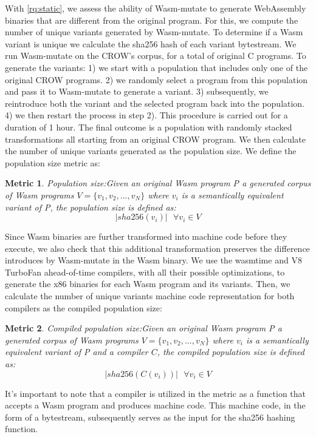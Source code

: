 \documentclass[sigplan,screen]{acmart}
\newcommand{\tool}{Wasm-mutate\xspace}
\newcommand{\wasm}{Wasm\xspace}
\newcommand{\Wasm}{WebAssembly\xspace}
\newtheorem{metric}{Metric}
\begin{document}
With \ref{rq:static},
we assess the ability of \tool to generate \Wasm binaries that are different from the original program.
For this, we compute the number of unique variants generated by \tool.
To determine if a \wasm variant is unique we calculate the sha256 hash of each variant bytestream.
We run \tool on the CROW's corpus, for a total of \nProgramsRosetta{} original C programs. 
To generate the variants:
1) we start with a population that includes only one of the original CROW programs. 
2) we randomly select a program from this population and pass it to \tool to generate a variant. 
3) subsequently, we reintroduce both the variant and the selected program back into the population. 
4) we then restart the process in step 2). 
This procedure is carried out for a duration of 1 hour.
The final outcome is a population with randomly stacked transformations all starting from an original CROW program.
We then calculate the number of unique variants generated as the population size.
We define the population size metric as:

\begin{metric}{Population size:}\label{metric:pop}
Given an original \wasm program P a generated corpus of \wasm programs $V=\{v_1, v_2, ..., v_N\}$ where $v_i$ is a semantically equivalent variant of P, the population size is defined as:
$$
    | sha256(v_i)|\text{ }\forall v_i \in V 
$$
\end{metric}


Since \wasm binaries are further transformed into machine code before they execute, we also check that this additional transformation preserves the difference introduces by \tool in the \wasm binary. 
We use the wasmtime and V8 TurboFan ahead-of-time compilers, with all their possible optimizations, to generate the x86 binaries for each \wasm program and its variants. 
Then, we calculate the number of unique variants machine code representation for both compilers as the compiled population size:


\begin{metric}{Compiled population size:}\label{metric:popcomp}
Given an original \wasm program P a generated corpus of \wasm programs $V=\{v_1, v_2, ..., v_N\}$ where $v_i$ is a semantically equivalent variant of P and a compiler $C$, the compiled population size is defined as:
$$
    | sha256(C(v_i))|\text{ } \forall v_i \in V 
$$

\end{metric}

It's important to note that a compiler is utilized in the metric as a function that accepts a \wasm program and produces machine code. 
This machine code, in the form of a bytestream, subsequently serves as the input for the sha256 hashing function.
\end{document}
